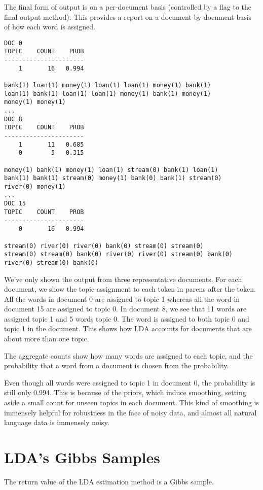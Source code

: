The final form of output is on a per-document basis (controlled
by a flag to the final output method).  This provides a report
on a document-by-document basis of how each word is assigned.
%
\begin{verbatim}
DOC 0
TOPIC    COUNT    PROB
----------------------
    1       16   0.994

bank(1) loan(1) money(1) loan(1) loan(1) money(1) bank(1) 
loan(1) bank(1) loan(1) loan(1) money(1) bank(1) money(1) 
money(1) money(1)
...
DOC 8
TOPIC    COUNT    PROB
----------------------
    1       11   0.685
    0        5   0.315

money(1) bank(1) money(1) loan(1) stream(0) bank(1) loan(1) 
bank(1) bank(1) stream(0) money(1) bank(0) bank(1) stream(0) 
river(0) money(1)
...
DOC 15
TOPIC    COUNT    PROB
----------------------
    0       16   0.994

stream(0) river(0) river(0) bank(0) stream(0) stream(0) 
stream(0) stream(0) bank(0) river(0) river(0) stream(0) bank(0) 
river(0) stream(0) bank(0)
\end{verbatim}
%
We've only shown the output from three representative documents.  For
each document, we show the topic assignment to each token in parens
after the token.  All the words in document 0 are assigned to topic 1
whereas all the word in document 15 are assigned to topic 0.  In
document 8, we see that 11 words are assigned topic 1 and 5 words
topic 0.  The word  is assigned to both topic 0
and topic 1 in the document.  This shows how LDA accounts for
documents that are about more than one topic.

The aggregate counts show how many words are assigned to each topic,
and the probability that a word from a document is chosen from the
probability.  

Even though all words were assigned to topic 1 in document 0, the
probability is still only 0.994.  This is because of the priors, which
induce smoothing, setting aside a small count for unseen topics in
each document.  This kind of smoothing is immensely helpful for
robustness in the face of noisy data, and almost all natural language
data is immensely noisy.


\section{LDA's Gibbs Samples}

The return value of the LDA estimation method is a Gibbs sample.


